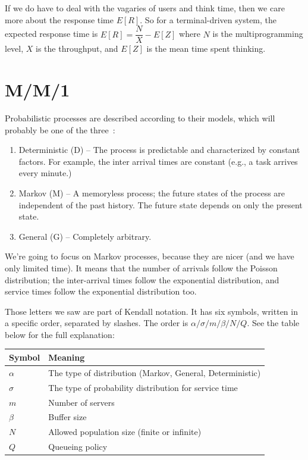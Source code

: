 \documentclass[a4paper]{report}
\begin{document}
If we do have to deal with the vagaries of users and think time, then we care more about the response time $E[R]$. So for a terminal-driven system, the expected response time is $E[R] = \dfrac{N}{X} - E[Z]$ where $N$ is the multiprogramming level, $X$ is the throughput, and $E[Z]$ is the mean time spent thinking. 

\section*{M/M/1}

Probabilistic processes are described according to their models, which will probably be one of the three~\cite{swps}:

\begin{enumerate}
	\item Deterministic (D) -- The process is predictable and characterized by constant factors. For example, the inter arrival times are constant (e.g., a task arrives every minute.)
	\item Markov (M) -- A memoryless process; the future states of the process are independent of the past history. The future state depends on only the present state.
	\item General (G) -- Completely arbitrary.
\end{enumerate}

We're going to focus on Markov processes, because they are nicer (and we have only limited time). It means that the number of arrivals follow the Poisson distribution; the inter-arrival times follow the exponential distribution, and service times follow the exponential distribution too. 

Those letters we saw are part of Kendall notation. It has six symbols, written in a specific order, separated by slashes. The order is $\alpha / \sigma / m / \beta / N / Q$. See the table below for the full explanation:

\begin{center}
\begin{tabular}{l|l} 
	\textbf{Symbol} & \textbf{Meaning} \\ \hline
	$\alpha$ & The type of distribution (Markov, General, Deterministic) \\ \hline
	$\sigma$ & The type of probability distribution for service time \\ \hline
	$m$ & Number of servers \\ \hline
	$\beta$ & Buffer size \\ \hline
	$N$ & Allowed population size (finite or infinite) \\ \hline
	$Q$ & Queueing policy \\ 
\end{tabular}
\end{center}
\end{document}
